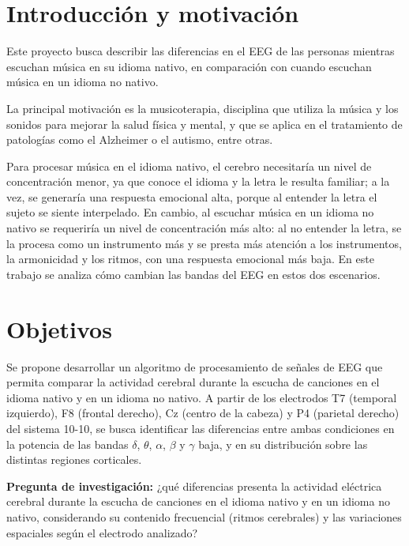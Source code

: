 \documentclass[11pt,a4paper]{article}
\begin{document}
\section{Introducción y motivación}
Este proyecto busca describir las diferencias en el EEG de las personas mientras escuchan música en su idioma nativo, en comparación con cuando escuchan música en un idioma no nativo.

La principal motivación es la musicoterapia, disciplina que utiliza la música y los sonidos para mejorar la salud física y mental, y que se aplica en el tratamiento de patologías como el Alzheimer o el autismo, entre otras.

Para procesar música en el idioma nativo, el cerebro necesitaría un nivel de concentración menor, ya que conoce el idioma y la letra le resulta familiar; a la vez, se generaría una respuesta emocional alta, porque al entender la letra el sujeto se siente interpelado. En cambio, al escuchar música en un idioma no nativo se requeriría un nivel de concentración más alto: al no entender la letra, se la procesa como un instrumento más y se presta más atención a los instrumentos, la armonicidad y los ritmos, con una respuesta emocional más baja. En este trabajo se analiza cómo cambian las bandas del EEG en estos dos escenarios.

\section{Objetivos}
Se propone desarrollar un algoritmo de procesamiento de señales de EEG que permita comparar la actividad cerebral durante la escucha de canciones en el idioma nativo y en un idioma no nativo. A partir de los electrodos T7 (temporal izquierdo), F8 (frontal derecho), Cz (centro de la cabeza) y P4 (parietal derecho) del sistema 10-10, se busca identificar las diferencias entre ambas condiciones en la potencia de las bandas $\delta$, $\theta$, $\alpha$, $\beta$ y $\gamma$ baja, y en su distribución sobre las distintas regiones corticales.

\textbf{Pregunta de investigación:} ¿qué diferencias presenta la actividad eléctrica cerebral durante la escucha de canciones en el idioma nativo y en un idioma no nativo, considerando su contenido frecuencial (ritmos cerebrales) y las variaciones espaciales según el electrodo analizado?
\end{document}
